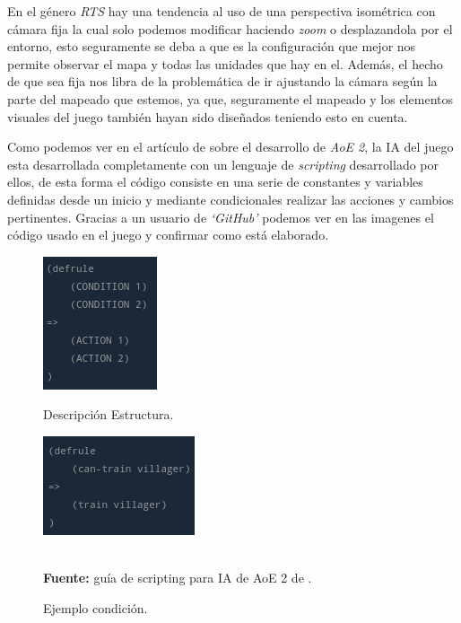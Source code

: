 En el género \textit{\ac{RTS}} hay una tendencia al uso de una perspectiva isométrica con cámara fija
la cual solo podemos modificar haciendo \textit{zoom} o desplazandola por el entorno, esto seguramente
se deba a que es la configuración que mejor nos permite observar el mapa y todas las unidades que
hay en el. Además, el hecho de que sea fija nos libra de la problemática de ir ajustando la
cámara según la parte del mapeado que estemos, ya que, seguramente el mapeado y los elementos
visuales del juego también hayan sido diseñados teniendo esto en cuenta.

Como podemos ver en el artículo de \citeauthor*{Pritchard2000} sobre el desarrollo de \textit{\ac{AoE} 2},
la \ac{IA} del juego esta desarrollada completamente con un lenguaje de \textit{scripting} desarrollado
por ellos, de esta forma el código consiste en una serie de constantes y variables definidas desde un
inicio y mediante condicionales realizar las acciones  y cambios pertinentes. Gracias a un usuario
de \textit{`GitHub'} podemos ver en las imagenes el código usado en el juego y confirmar como está elaborado.

\begin{figure}[ht]
\centering
\begin{minipage}[c]{0.45\linewidth}
	\hspace{20mm}
	\includegraphics[height=0.15\textheight]{imagenes/marco_teo/referentes/aoe_scripting_1.png}
	\caption{Descripción Estructura.}
\end{minipage}
\begin{minipage}[c]{0.45\linewidth}
	\hspace{9mm}
	\includegraphics[height=0.15\textheight]{imagenes/marco_teo/referentes/aoe_scripting_2.png}
	\caption{Ejemplo condición.}
	\label{img:aoe_script_2}
\end{minipage}\\[3mm]
\textbf{Fuente:} guía de scripting para \ac{IA} de \ac{AoE} 2 de \citeauthor*{redmechanic2017}.
\end{figure}

